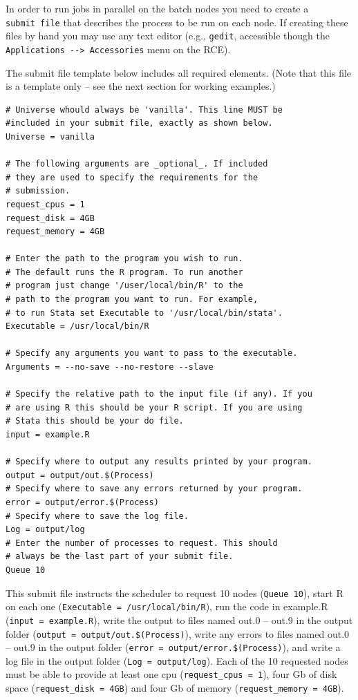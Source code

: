 \documentclass[]{book}
\begin{document}
In order to run jobs in parallel on the batch nodes you need to create a
\texttt{submit\ file} that describes the process to be run on each node.
If creating these files by hand you may use any text editor (e.g.,
\texttt{gedit}, accessible though the
\texttt{Applications\ -\/-\textgreater{}\ Accessories} menu on the RCE).

The submit file template below includes all required elements. (Note
that this file is a template only -- see the next section for working
examples.)

\begin{verbatim}
# Universe whould always be 'vanilla'. This line MUST be
#included in your submit file, exactly as shown below.
Universe = vanilla

# The following arguments are _optional_. If included
# they are used to specify the requirements for the
# submission.
request_cpus = 1
request_disk = 4GB
request_memory = 4GB

# Enter the path to the program you wish to run.
# The default runs the R program. To run another
# program just change '/user/local/bin/R' to the
# path to the program you want to run. For example,
# to run Stata set Executable to '/usr/local/bin/stata'.
Executable = /usr/local/bin/R

# Specify any arguments you want to pass to the executable.
Arguments = --no-save --no-restore --slave

# Specify the relative path to the input file (if any). If you
# are using R this should be your R script. If you are using
# Stata this should be your do file.
input = example.R

# Specify where to output any results printed by your program.
output = output/out.$(Process)
# Specify where to save any errors returned by your program.
error = output/error.$(Process)
# Specify where to save the log file.
Log = output/log
# Enter the number of processes to request. This should
# always be the last part of your submit file.
Queue 10
\end{verbatim}

This submit file instructs the scheduler to request 10 nodes
(\texttt{Queue\ 10}), start R on each one
(\texttt{Executable\ =\ /usr/local/bin/R}), run the code in example.R
(\texttt{input\ =\ example.R}), write the output to files named out.0 --
out.9 in the output folder (\texttt{output\ =\ output/out.\$(Process)}),
write any errors to files named out.0 -- out.9 in the output folder
(\texttt{error\ =\ output/error.\$(Process)}), and write a log file in
the output folder (\texttt{Log\ =\ output/log}). Each of the 10
requested nodes must be able to provide at least one cpu
(\texttt{request\_cpus\ =\ 1}), four Gb of disk space
(\texttt{request\_disk\ =\ 4GB}) and four Gb of memory
(\texttt{request\_memory\ =\ 4GB}).
\end{document}
